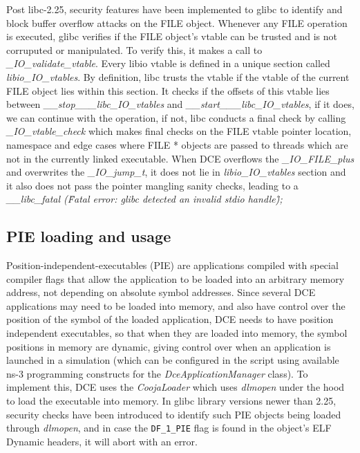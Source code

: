 \documentclass{sig-alternate}
\begin{document}
\sloppy Post libc-2.25, security features have been implemented to glibc to identify 
and block buffer overflow attacks on the FILE object. Whenever any FILE
operation is executed, glibc 
verifies if the FILE object's vtable can be trusted and is not corruputed or manipulated. To verify this, it makes a call to 
\textit{\_IO\_validate\_vtable}. Every libio vtable is defined in a unique section called \textit{libio\_IO\_vtables}. By definition, libc trusts
the vtable if the vtable of the current FILE object lies within this section. It checks if the offsets of this vtable lies between 
\textit{\_\_stop\_\_\_libc\_IO\_vtables} and \textit{\_\_start\_\_\_libc\_IO\_vtables}, if it does, we can continue with the operation, if not, libc 
conducts a final check by calling \textit{\_IO\_vtable\_check} which makes final checks on the FILE vtable pointer location, namespace and edge cases
where FILE * objects are passed to threads which are not in the currently linked executable.  When DCE overflows the \textit{\_IO\_FILE\_plus} and 
overwrites the \textit{\_IO\_jump\_t}, it does not lie in \textit{libio\_IO\_vtables} section and it also does not pass the pointer mangling sanity checks, leading to a \textit{\_\_libc\_fatal (\"Fatal error: glibc detected an invalid stdio handle\");}

\subsection{PIE loading and usage}
Position-independent-executables (PIE) are applications compiled with special compiler flags that allow the application to be loaded into an arbitrary
memory address, not depending on absolute symbol addresses. Since several DCE applications may need to be loaded into memory, and also have control over the
position of the  symbol of the loaded application, DCE needs to have position independent executables, so that when they are loaded into memory,
the symbol positions in memory are dynamic, giving control over when an application is launched in a simulation (which can be configured in the script 
using available ns-3 programming constructs for the \textit{DceApplicationManager} class). To implement this, DCE uses the \textit{CoojaLoader} which 
uses \textit{dlmopen} under the hood to load the executable into memory. In glibc library versions newer than 2.25, security checks have been introduced to identify such 
PIE objects being loaded through \textit{dlmopen}, and in case the \texttt{DF\_1\_PIE} flag is found in the object's ELF Dynamic headers, it will abort with an error.
 
\end{document}
